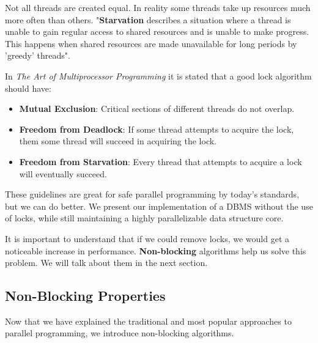 \documentclass[letterpaper, 12pt]{article}
\begin{document}
Not all threads are created equal. In reality some threads take up resources much more often than others.
"{\bfseries Starvation} describes a situation where a thread is unable to gain regular access
to shared resources and is unable to make progress. This happens when shared resources are
made unavailable for long periods by 'greedy' threads"\citep{oracleconcurrency}.

\par\vspace{\baselineskip}

In \textit{The Art of Multiprocessor Programming}\citep{artofmulti} it is stated that a good lock algorithm should have:

\begin{itemize}
	\item {\bfseries Mutual Exclusion}: Critical sections of different threads do not overlap.
	\item {\bfseries Freedom from Deadlock}: If some thread attempts to acquire the lock, them some thread will succeed in acquiring the lock.
	\item {\bfseries Freedom from Starvation}: Every thread that attempts to acquire a lock will eventually succeed.
\end{itemize}

These guidelines are great for safe parallel programming by today's standards, but we can do better.
We present our implementation of a DBMS without the use of locks, while still maintaining a highly 
parallelizable data structure core.
\par\vspace{\baselineskip}

It is important to understand that if we could remove locks, we would get a noticeable increase in performance.
{\bfseries Non-blocking} algorithms help us solve this problem. We will talk about them in the next section.

\subsection{Non-Blocking Properties}

Now that we have explained the traditional and most popular approaches to parallel programming, we introduce non-blocking algorithms.
\end{document}
